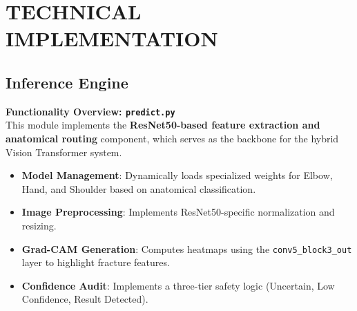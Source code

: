 \documentclass[a4paper,12pt]{report}
\begin{document}
    \chapter{TECHNICAL IMPLEMENTATION}
    \section{Inference Engine}
    \textbf{Functionality Overview: \texttt{predict.py}} \\
    This module implements the \textbf{ResNet50-based feature extraction and anatomical routing} component, which serves as the backbone for the hybrid Vision Transformer system.
    \begin{itemize}
        \item \textbf{Model Management}: Dynamically loads specialized weights for Elbow, Hand, and Shoulder based on anatomical classification.
        \item \textbf{Image Preprocessing}: Implements ResNet50-specific normalization and resizing.
        \item \textbf{Grad-CAM Generation}: Computes heatmaps using the \texttt{conv5\_block3\_out} layer to highlight fracture features.
        \item \textbf{Confidence Audit}: Implements a three-tier safety logic (Uncertain, Low Confidence, Result Detected).
    \end{itemize}
\end{document}
